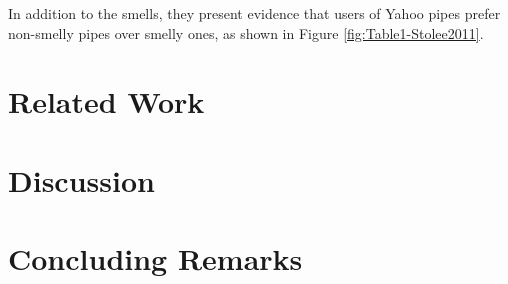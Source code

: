 \documentclass[10pt,conference,compsocconf]{IEEEtran}
\begin{document}
In addition to the smells, they present evidence that users of Yahoo pipes prefer non-smelly pipes over smelly ones, as shown in Figure \ref{fig:Table1-Stolee2011}.


\section{Related Work}
\label{sec:related_work}

\section{Discussion}
\label{sec:discussion}


\section{Concluding Remarks}
\label{sec:conclusions}

\newpage
\balance

\nocite{sui2008automated}



\end{document}
